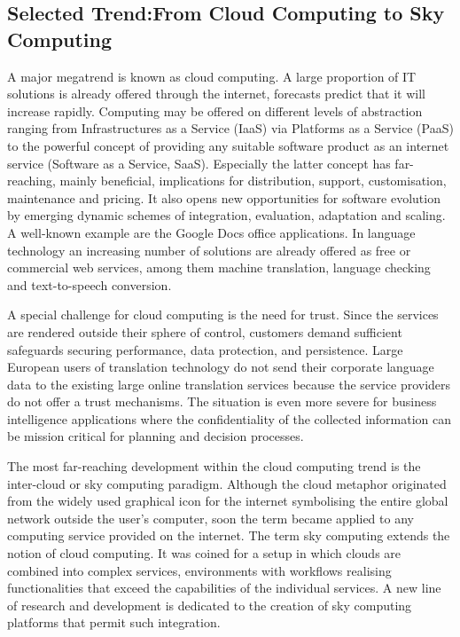 \documentclass[10pt, plain]{../../metanetpaper}
\begin{document}
\begin{multicols}{2}
\subsection[Selected Trend: From Cloud Computing to Sky Computing]{Selected Trend:\newline From Cloud Computing to Sky Computing}
\label{sec:cloud-sky-computing}

A major megatrend is known as cloud computing. A large proportion of IT solutions is already offered through the internet, forecasts predict that it will increase rapidly. Computing may be offered on different levels of abstraction ranging from Infrastructures as a Service (IaaS) via Platforms as a Service (PaaS) to the powerful concept of providing any suitable software product as an internet service (Software as a Service, SaaS). Especially the latter concept has far-reaching, mainly beneficial, implications for distribution, support, customisation, maintenance and pricing. It also opens new opportunities for software evolution by emerging dynamic schemes of integration, evaluation, adaptation and scaling. A well-known example are the Google Docs office applications. In language technology an increasing number of solutions are already offered as free or commercial web services, among them machine translation, language checking and text-to-speech conversion.

A special challenge for cloud computing is the need for trust. Since the services are rendered outside their sphere of control, customers demand sufficient safeguards securing performance, data protection, and persistence. Large European users of translation technology do not send their corporate language data to the existing large online translation services because the service providers do not offer a trust mechanisms. The situation is even more severe for business intelligence applications where the confidentiality of the collected information can be mission critical for planning and decision processes.  

The most far-reaching development within the cloud computing trend is the inter-cloud or sky computing paradigm. Although the cloud metaphor originated from the widely used graphical icon for the internet symbolising the entire global network outside the user’s computer, soon the term became applied to any computing service provided on the internet. The term sky computing extends the notion of cloud computing. It was coined for a setup in which clouds are combined into complex services, environments with workflows realising functionalities that exceed the capabilities of the individual services. A new line of research and development is dedicated to the creation of sky computing platforms that permit such integration.


\end{multicols}
\end{document}
